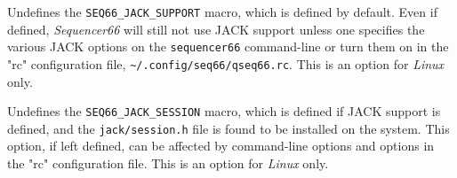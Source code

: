         Undefines the \texttt{SEQ66\_JACK\_SUPPORT} macro, which is
        defined by default.  Even if defined,
        \textsl{Sequencer66} will still not use JACK support unless
        one specifies the various JACK options on the \texttt{sequencer66}
        command-line or turn them on in the "rc" configuration file,
        \texttt{\textasciitilde/.config/seq66/qseq66.rc}.
        This is an option for \textsl{Linux} only.

        Undefines the \texttt{SEQ66\_JACK\_SESSION} macro, which is
        defined if JACK support is defined, and the
        \texttt{jack/session.h} file is found to be installed on the system.
        This option, if left defined, can be affected by
        command-line options and options in the "rc" configuration file.
        This is an option for \textsl{Linux} only.

%
%
%

